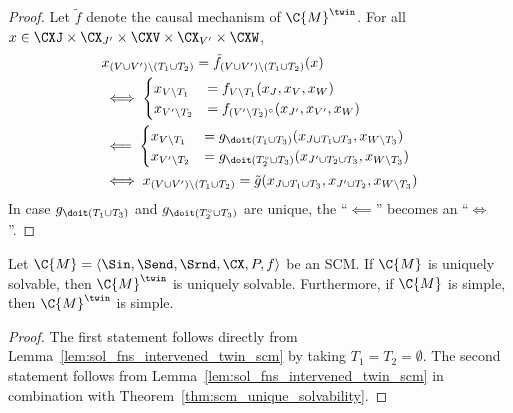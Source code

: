 \begin{proof}
Let $\tilde{f}$ denote the causal mechanism of $\C{M}^\twin$.
For all $x \in \CXJ \times \CX_{J'} \times \CXV \times \CX_{V'} \times \CXW$,
  \begin{equation*}\begin{split}
    & x_{(V \cup V') \setminus (T_1 \cup T_2)} = \tilde{f}_{(V \cup V') \setminus (T_1 \cup T_2)}(x) \\
    & \iff \begin{cases}
      x_{V\setminus T_1}  &= f_{V\setminus T_1}(x_J,x_V,x_W) \\
      x_{V'\setminus T_2} &= f_{(V'\setminus T_2)^\circ}(x_{J'},x_{V'},x_W)
    \end{cases} \\
    & \impliedby \begin{cases}
      x_{V\setminus T_1} &= g_{\doit(T_1\cup T_3)}(x_{J\cup T_1\cup T_3},x_{W\setminus T_3}) \\
      x_{V'\setminus T_2} &= g_{\doit(T_2^\circ \cup T_3)}(x_{J'\cup T_2 \cup T_3},x_{W\setminus T_3})
    \end{cases}\\
    & \iff 
    x_{(V \cup V') \setminus (T_1 \cup T_2)} = \tilde{g}(x_{J \cup T_1 \cup T_3}, x_{J' \cup T_2}, x_{W \setminus T_3})
  \end{split}\end{equation*}
In case $g_{\doit(T_1 \cup T_3)}$ and $g_{\doit(T_2^\circ \cup T_3)}$ are unique, the ``$\impliedby$'' becomes an ``$\iff$''.
\end{proof}
\begin{Prp}
Let $\C{M} = \langle \Sin, \Send, \Srnd, \CX, P, f \rangle$ be an SCM.
If $\C{M}$ is uniquely solvable, then $\C{M}^{\twin}$ is uniquely solvable.
Furthermore, if $\C{M}$ is simple, then $\C{M}^{\twin}$ is simple.
\end{Prp}
\begin{proof}
  The first statement follows directly from Lemma~\ref{lem:sol_fns_intervened_twin_scm} by taking $T_1 = T_2 = \emptyset$.
  The second statement follows from Lemma~\ref{lem:sol_fns_intervened_twin_scm} in combination with
  Theorem~\ref{thm:scm_unique_solvability}.
\end{proof}

